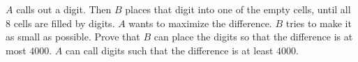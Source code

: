 $A$ calls out a digit. Then $B$ places that digit into one of the empty cells, until all $8$ cells are filled by digits. $A$ wants to maximize the difference. $B$ tries to make it as small as possible. Prove that $B$ can place the digits so that the difference is at most $4000$. $A$ can call digits such that the difference is at least $4000$.
\begin{center}
\end{center}
